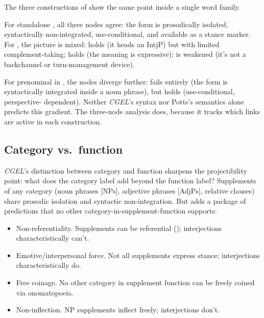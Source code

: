 \documentclass[12pt]{article}
\begin{document}
The three constructions of  show the same point inside a
single word family.

For standalone
, all three nodes agree: the form is prosodically
isolated, syntactically non-integrated, use-conditional, and available
as a stance marker. For , the picture
is mixed:  holds (it heads an IntjP)
but with limited complement-taking;
 holds (the meaning is expressive);
 is weakened (it's not a backchannel or
turn-management device).

For prenominal  in , the nodes
diverge further:  fails entirely (the
form is syntactically integrated inside a noun phrase), but
 holds (use-conditional, perspective-
dependent). Neither \textit{CGEL}'s syntax nor Potts's semantics alone
predicts this gradient. The three-node analysis does, because it tracks
which links are active in each construction.

\subsection{Category vs.\ function}

\textit{CGEL}'s distinction between category and function sharpens the
projectibility point: what does the  category label add
beyond the  function label? Supplements of any category
(noun phrases [NPs], adjective phrases [AdjPs], relative clauses) share
prosodic isolation and syntactic
non-integration. But  adds a package of
predictions that no other category-in-supplement-function supports:

\begin{itemize}
\item Non-referentiality. Supplements can be referential
  (); interjections
  characteristically can't.
\item Emotive/interpersonal force. Not all supplements express
  stance; interjections characteristically do.
\item Free coinage. No other category in supplement function
  can be freely coined via onomatopoeia.
\item Non-inflection. NP supplements inflect freely;
  interjections don't.
\end{itemize}
\end{document}
